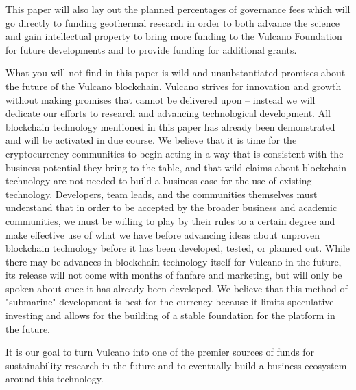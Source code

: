 \documentclass[A4paper, 12pt]{article}
\begin{document}
This paper will also lay out the planned percentages of governance fees which will go directly to funding geothermal research in order to both advance the science and gain intellectual property to bring more funding to the Vulcano Foundation for future developments and to provide funding for additional grants. 

What you will not find in this paper is wild and unsubstantiated promises about the future of the Vulcano blockchain. Vulcano strives for innovation and growth without making promises that cannot be delivered upon – instead we will dedicate our efforts to research and advancing technological development. All blockchain technology mentioned in this paper has already been demonstrated and will be activated in due course. We believe that it is time for the cryptocurrency communities to begin acting in a way that is consistent with the business potential they bring to the table, and that wild claims about blockchain technology are not needed to build a business case for the use of existing technology. Developers, team leads, and the communities themselves must understand that in order to be accepted by the broader business and academic communities, we must be willing to play by their rules to a certain degree and make effective use of what we have before advancing ideas about unproven blockchain technology before it has been developed, tested, or planned out. While there may be advances in blockchain technology itself for Vulcano in the future, its release will not come with months of fanfare and marketing, but will only be spoken about once it has already been developed. We believe that this method of "submarine" development is best for the currency because it limits speculative investing and allows for the building of a stable foundation for the platform in the future. 

It is our goal to turn Vulcano into one of the premier sources of funds for sustainability research in the future and to eventually build a business ecosystem around this technology.
\end{document}
